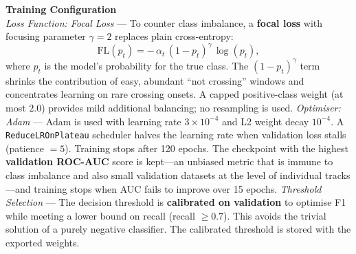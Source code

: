 \documentclass[conference]{IEEEtran}
\begin{document}
\textbf{Training Configuration} \\
\textit{Loss Function: Focal Loss} ---
To counter class imbalance, a \textbf{focal loss} with focusing parameter $\gamma = 2$ replaces plain cross-entropy:
\begin{equation}
    \text{FL}(p_t) = -\,\alpha_t\,(1 - p_t)^{\gamma}\,\log(p_t),
\end{equation}
where $p_t$ is the model's probability for the true class. The $(1-p_t)^{\gamma}$ term shrinks the contribution of easy, abundant ``not crossing'' windows and concentrates learning on rare crossing onsets. A capped positive-class weight (at most $2.0$) provides mild additional balancing; no resampling is used.
\textit{Optimiser: Adam} ---
Adam is used with learning rate $3\times10^{-4}$ and L2 weight decay $10^{-4}$. A \texttt{ReduceLROnPlateau} scheduler halves the learning rate when validation loss stalls (patience $= 5$).
Training stops after 120 epochs. The checkpoint with the highest \textbf{validation ROC-AUC} score is kept---an unbiased metric that is immune to class imbalance and also small validation datasets at the level of individual tracks---and training stops when AUC fails to improve over 15 epochs.
\textit{Threshold Selection} ---
The decision threshold is \textbf{calibrated on validation} to optimise F1 while meeting a lower bound on recall (recall $\geq 0.7$). This avoids the trivial solution of a purely negative classifier. The calibrated threshold is stored with the exported weights.
\end{document}
